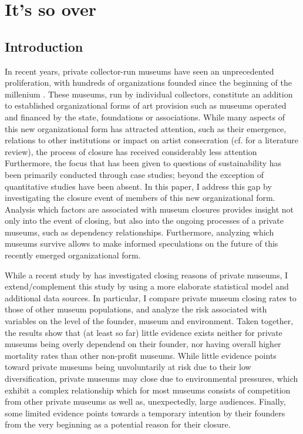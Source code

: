 \documentclass[12pt]{article}
\author{Johannes }
\date{\today}
\title{}
\begin{document}
\section*{It's so over}

\subsection*{Introduction}


In recent years, private collector-run museums have seen an unprecedented proliferation, with hundreds of organizations founded since the beginning of the millenium \parencite{Velthuis_etal_2023_boom,LarrysList_2015_report}.
These museums, run by individual collectors, constitute an addition to established organizational forms of art provision such as museums operated and financed by the state, foundations or associations.
While many aspects of this new organizational form has attracted attention, such as their emergence, relations to other institutions or impact on artist consecration (cf. \cite{Kolbe_etal_2022_privatemuseum} for a literature review), the process of closure has received considerably less attention
Furthermore, the focus that has been given to questions of sustainability has been primarily conducted through case studies; beyond the exception of \textcite{Velthuis_Gera_2024_fragility} quantitative studies have been absent.
In this paper, I address this gap by investigating the closure event of members of this new organizational form.
Analysis which factors are associated with museum closures provides insight not only into the event of closing, but also into the ongoing processes of a private museums, such as dependency relationships.
Furthermore, analyzing which museums survive allows to make informed speculations on the future of this recently emerged organizational form.


While a recent study by \textcite{Velthuis_Gera_2024_fragility} has investigated closing reasons of private museums, I extend/complement this study by using a more elaborate statistical model and additional data sources.
In particular, I compare private museum closing rates to those of other museum populations, and analyze the risk associated with variables on the level of the founder, museum and environment. 
Taken together, the results show that (at least so far) little evidence exists neither for private museums being overly dependend on their founder, nor having overall higher mortality rates than other non-profit museums.
While little evidence points toward private museums being unvoluntarily at risk due to their low diversification, private museums may close due to environmental pressures, which exhibit a complex relationship which for most museums consists of competition from other private museums as well as, unexpectedly, large audiences.
Finally, some limited evidence points towards a temporary intention by their founders from the very beginning as a potential reason for their closure. 
\end{document}
